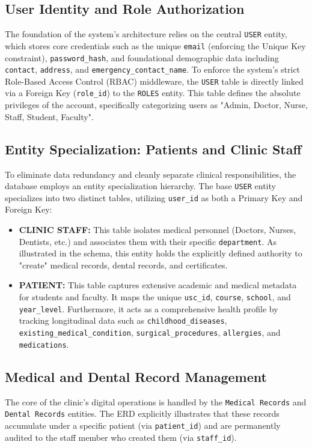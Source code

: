 \subsection{User Identity and Role Authorization}
The foundation of the system's architecture relies on the central \texttt{USER} entity, which stores core credentials such as the unique \texttt{email} (enforcing the Unique Key constraint), \texttt{password\_hash}, and foundational demographic data including \texttt{contact}, \texttt{address}, and \texttt{emergency\_contact\_name}. To enforce the system's strict Role-Based Access Control (RBAC) middleware, the \texttt{USER} table is directly linked via a Foreign Key (\texttt{role\_id}) to the \texttt{ROLES} entity. This table defines the absolute privileges of the account, specifically categorizing users as "Admin, Doctor, Nurse, Staff, Student, Faculty".

\subsection{Entity Specialization: Patients and Clinic Staff}
To eliminate data redundancy and cleanly separate clinical responsibilities, the database employs an entity specialization hierarchy. The base \texttt{USER} entity specializes into two distinct tables, utilizing \texttt{user\_id} as both a Primary Key and Foreign Key:

\begin{itemize}
    \item \textbf{CLINIC STAFF:} This table isolates medical personnel (Doctors, Nurses, Dentists, etc.) and associates them with their specific \texttt{department}. As illustrated in the schema, this entity holds the explicitly defined authority to "create" medical records, dental records, and certificates.
    \item \textbf{PATIENT:} This table captures extensive academic and medical metadata for students and faculty. It maps the unique \texttt{usc\_id}, \texttt{course}, \texttt{school}, and \texttt{year\_level}. Furthermore, it acts as a comprehensive health profile by tracking longitudinal data such as \texttt{childhood\_diseases}, \texttt{existing\_medical\_condition}, \texttt{surgical\_procedures}, \texttt{allergies}, and \texttt{medications}.
\end{itemize}

\subsection{Medical and Dental Record Management}
The core of the clinic's digital operations is handled by the \texttt{Medical Records} and \texttt{Dental Records} entities. The ERD explicitly illustrates that these records accumulate under a specific patient (via \texttt{patient\_id}) and are permanently audited to the staff member who created them (via \texttt{staff\_id}).

